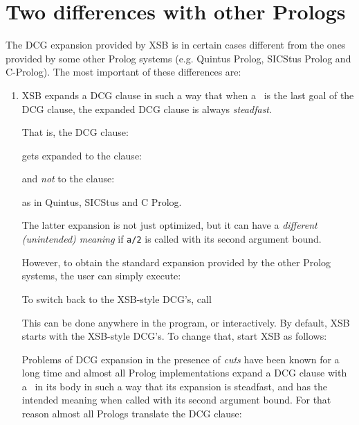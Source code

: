 \section{Two differences with other Prologs}\label{sec-dcg-differences}
The DCG expansion provided by XSB is in certain cases different 
from the ones provided by some other Prolog systems (e.g.  Quintus Prolog, 
SICStus Prolog and C-Prolog). The most important of these differences are:
\begin{enumerate}
\item XSB expands a DCG clause in such a way that when a \cut\ is 
      the last goal of the DCG clause, the expanded DCG clause is always 
      {\em steadfast}.

      That is, the DCG clause:


      \noindent
      gets expanded to the clause:


      \noindent
      and {\em not\/} to the clause:


      \noindent
      as in Quintus, SICStus and C Prolog.

      The latter expansion is not just optimized, but it can have a
      {\em different (unintended) meaning} if {\tt a/2} is called with
      its second argument bound.

      However, to obtain the standard expansion provided by the other Prolog
      systems, the user can simply execute:
      
    
      To switch back to the XSB-style DCG's, call
      

      This can be done anywhere in the program, or interactively.
      By default, XSB starts with the XSB-style DCG's. To change that,
      start XSB as follows:


      Problems of DCG expansion in the presence of {\em cuts} have been known
      for a long time and almost all Prolog implementations expand a DCG
      clause with a \cut\ in its body in such a way that its expansion is
      steadfast, and has the intended meaning when called with its second
      argument bound.  For that reason almost all Prologs translate the DCG
      clause:


\end{enumerate}
